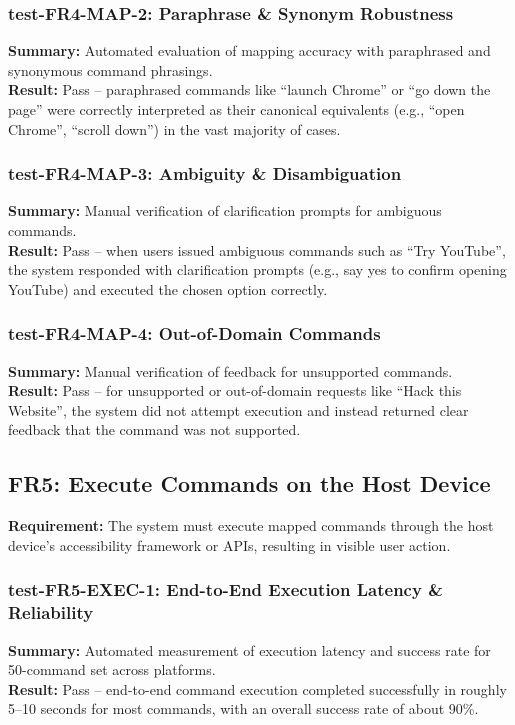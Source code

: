 \documentclass[12pt, titlepage]{article}
\begin{document}
\subsubsection{test-FR4-MAP-2: Paraphrase \& Synonym Robustness}
\textbf{Summary:} Automated evaluation of mapping accuracy with paraphrased and synonymous command phrasings.\\
\textbf{Result:} Pass -- paraphrased commands like ``launch Chrome'' or ``go down the page'' were correctly interpreted as their canonical equivalents (e.g., ``open Chrome'', ``scroll down'') in the vast majority of cases.

\subsubsection{test-FR4-MAP-3: Ambiguity \& Disambiguation}
\textbf{Summary:} Manual verification of clarification prompts for ambiguous commands.\\
\textbf{Result:} Pass -- when users issued ambiguous commands such as ``Try YouTube'', the system responded with clarification prompts (e.g., say yes to confirm opening YouTube) and executed the chosen option correctly.

\subsubsection{test-FR4-MAP-4: Out-of-Domain Commands}
\textbf{Summary:} Manual verification of feedback for unsupported commands.\\
\textbf{Result:} Pass -- for unsupported or out-of-domain requests like ``Hack this Website'', the system did not attempt execution and instead returned clear feedback that the command was not supported.

\subsection{FR5: Execute Commands on the Host Device}

\textbf{Requirement:} The system must execute mapped commands through the host device's accessibility framework or APIs, resulting in visible user action. 


\subsubsection{test-FR5-EXEC-1: End-to-End Execution Latency \& Reliability}
\textbf{Summary:} Automated measurement of execution latency and success rate for 50-command set across platforms.\\
\textbf{Result:} Pass -- end-to-end command execution completed successfully in roughly 5--10 seconds for most commands, with an overall success rate of about 90\%.
\end{document}
